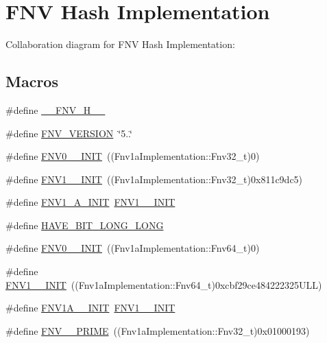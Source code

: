 \hypertarget{group__hash__fnv}{}\section{F\+NV Hash Implementation}
\label{group__hash__fnv}
Collaboration diagram for F\+NV Hash Implementation\+:
\subsection*{Macros}
\begin{DoxyCompactItemize}
\item 
\#define \hyperlink{group__hash__fnv_gac8e163567fdac1fd24f2871819172457}{\+\_\+\+\_\+\+F\+N\+V\+\_\+\+H\+\_\+\+\_\+}
\item 
\#define \hyperlink{group__hash__fnv_gafc332c72d6d3d69585287caedad7c292}{F\+N\+V\+\_\+\+V\+E\+R\+S\+I\+ON}~\char`\"{}5..\char`\"{}
\item 
\#define \hyperlink{group__hash__fnv_ga059b80066b559fcc2869a8679f2abd3a}{F\+N\+V0\+\_\+\_\+\+I\+N\+IT}~((Fnv1a\+Implementation\+::\+Fnv32\+\_\+t)0)
\item 
\#define \hyperlink{group__hash__fnv_ga47ad2404853d345b29ec28838f6414f7}{F\+N\+V1\+\_\+\_\+\+I\+N\+IT}~((Fnv1a\+Implementation\+::\+Fnv32\+\_\+t)0x811c9dc5)
\item 
\#define \hyperlink{group__hash__fnv_ga40a142ccb9ca21d50ea9f6ed8589cc96}{F\+N\+V1\+\_\+A\+\_\+\+I\+N\+IT}~\hyperlink{group__hash__fnv_ga47ad2404853d345b29ec28838f6414f7}{F\+N\+V1\+\_\+\_\+\+I\+N\+IT}
\item 
\#define \hyperlink{group__hash__fnv_gae08b3a786e98cbb5778e6fb75beaa485}{H\+A\+V\+E\+\_\+B\+I\+T\+\_\+\+L\+O\+N\+G\+\_\+\+L\+O\+NG}
\item 
\#define \hyperlink{group__hash__fnv_gacb9cb4b59bd9db3a5d335369fa58032a}{F\+N\+V0\+\_\+\_\+\+I\+N\+IT}~((Fnv1a\+Implementation\+::\+Fnv64\+\_\+t)0)
\item 
\#define \hyperlink{group__hash__fnv_ga97c6e8016ffe540a627163d406059552}{F\+N\+V1\+\_\+\_\+\+I\+N\+IT}~((Fnv1a\+Implementation\+::\+Fnv64\+\_\+t)0xcbf29ce484222325\+U\+L\+L)
\item 
\#define \hyperlink{group__hash__fnv_ga1eb99785c4898f16341824639f52d50f}{F\+N\+V1\+A\+\_\+\_\+\+I\+N\+IT}~\hyperlink{group__hash__fnv_ga97c6e8016ffe540a627163d406059552}{F\+N\+V1\+\_\+\_\+\+I\+N\+IT}
\item 
\#define \hyperlink{group__hash__fnv_gae13a6565bea334e9b6fb19033a392857}{F\+N\+V\+\_\+\_\+\+P\+R\+I\+ME}~((Fnv1a\+Implementation\+::\+Fnv32\+\_\+t)0x01000193)
\end{DoxyCompactItemize}

